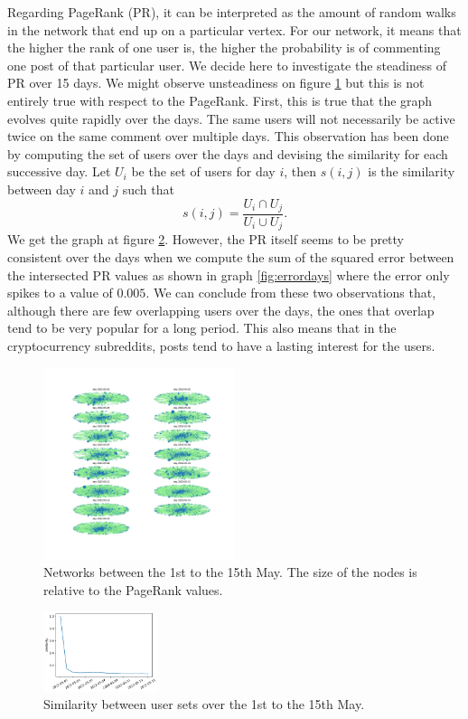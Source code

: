 Regarding PageRank (PR), it can be interpreted as the amount of random walks in the network that end up on a particular vertex. For our network, it means that the higher the rank of one user is, the higher the probability is of commenting one post of that particular user. We decide here to investigate the steadiness of PR over 15 days. We might observe unsteadiness on figure \ref{fig:rankdays} but this is not entirely true with respect to the PageRank. First, this is true that the graph evolves quite rapidly over the days. The same users will not necessarily be active twice on the same comment over multiple days. This observation has been done by computing the set of users over the days and devising the similarity for each successive day. Let $U_i$ be the set of users for day $i$, then $s\left(i,j\right)$ is the similarity between day $i$ and $j$ such that $$s\left(i,j\right)=\frac{U_i\cap U_{j}}{U_i\cup U_{j}}.$$ We get the graph at figure \ref{fig:simdays}. However, the PR itself seems to be pretty consistent over the days when we compute the sum of the squared error between the intersected PR values as shown in graph \ref{fig:errordays} where the error only spikes to a value of $0.005$. We can conclude from these two observations that, although there are few overlapping users over the days, the ones that overlap tend to be very popular for a long period. This also means that in the cryptocurrency subreddits, posts tend to have a lasting interest for the users.
\begin{figure}[hb!]
    \centering
    \includegraphics[width=0.5\textwidth]{figures/rank_days.pdf}
    \caption{Networks between the 1st to the 15th May. The size of the nodes is relative to the PageRank values.}
    \label{fig:rankdays}
\end{figure}
\begin{figure}[hb!]
    \centering
    \includegraphics[width=0.3\textwidth]{figures/sim_days.pdf}
    \caption{Similarity between user sets over the 1st to the 15th May.}
    \label{fig:simdays}
\end{figure}
